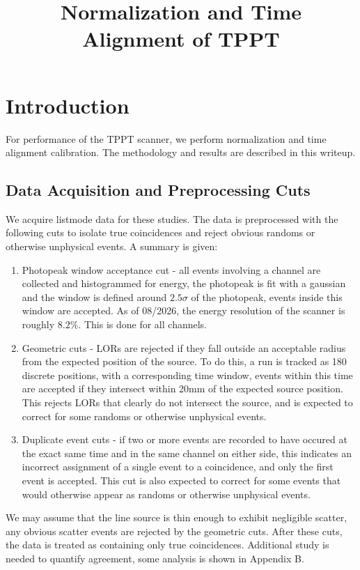 \documentclass{article}
\title{Normalization and Time Alignment of TPPT}
\begin{document}
\maketitle

\tableofcontents
\newpage
\section{Introduction}
For performance of the TPPT scanner, we perform normalization and time alignment calibration. The methodology and results are described in this writeup.

\subsection{Data Acquisition and Preprocessing Cuts}
We acquire listmode data for these studies. The data is preprocessed with the following cuts to isolate true coincidences and reject obvious randoms or otherwise unphysical events. A summary is given:
\begin{enumerate}
    \item Photopeak window acceptance cut - all events involving a channel are collected and histogrammed for energy, the photopeak is fit with a gaussian and the window is defined around $2.5\sigma$ of the photopeak, events inside this window are accepted. As of 08/2026, the energy resolution of the scanner is roughly $8.2\%$. This is done for all channels.
    \item Geometric cuts - LORs are rejected if they fall outside an acceptable radius from the expected position of the source. To do this, a run is tracked as 180 discrete positions, with a corresponding time window, events within this time are accepted if they intersect within 20mm of the expected source position. This rejects LORs that clearly do not intersect the source, and is expected to correct for some randoms or otherwise unphysical events.
    \item Duplicate event cuts - if two or more events are recorded to have occured at the exact same time and in the same channel on either side, this indicates an incorrect assignment of a single event to a coincidence, and only the first event is accepted. This cut is also expected to correct for some events that would otherwise appear as randoms or otherwise unphysical events.
\end{enumerate}

We may assume that the line source is thin enough to exhibit negligible scatter, any obvious scatter events are rejected by the geometric cuts. After these cuts, the data is treated as containing only true coincidences. Additional study is needed to quantify agreement, some analysis is shown in Appendix B.
\end{document}
